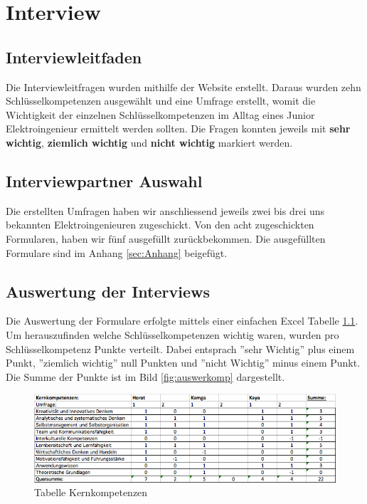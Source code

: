
\chapter{Interview}


\section{Interviewleitfaden}

Die Interviewleitfragen wurden mithilfe der Website \cite{Schluesselqualifikationen} erstellt. Daraus wurden zehn Schlüsselkompetenzen ausgewählt und eine Umfrage erstellt, womit die Wichtigkeit der einzelnen Schlüsselkompetenzen im Alltag eines Junior Elektroingenieur ermittelt werden sollten. Die Fragen konnten jeweils mit \textbf{sehr wichtig}, \textbf{ziemlich wichtig} und \textbf{nicht wichtig} markiert werden.   


\section{Interviewpartner Auswahl}

Die erstellten Umfragen haben wir anschliessend jeweils zwei bis drei uns bekannten Elektroingenieuren zugeschickt. Von den acht zugeschickten Formularen, haben wir fünf ausgefüllt zurückbekommen.
Die ausgefüllten Formulare sind im Anhang \ref{sec:Anhang} beigefügt. 

\section{Auswertung der Interviews}

Die Auswertung der Formulare erfolgte mittels einer einfachen Excel Tabelle \ref{fig:tabkernkomp}. Um herauszufinden welche Schlüsselkompetenzen wichtig waren, wurden pro Schlüsselkompetenz Punkte verteilt. Dabei entsprach ''sehr Wichtig'' plus einem Punkt, ''ziemlich wichtig'' null Punkten und ''nicht Wichtig'' minus einem Punkt. Die Summe der Punkte ist im Bild \ref{fig:auswerkomp} dargestellt. 

\begin{figure}[ht]
	\centering
	\includegraphics[width=1.2\textwidth]{images/Tabelle_Kernkompetenzen.png}
	\caption{Tabelle Kernkompetenzen}
	\label{fig:tabkernkomp}
\end{figure}

